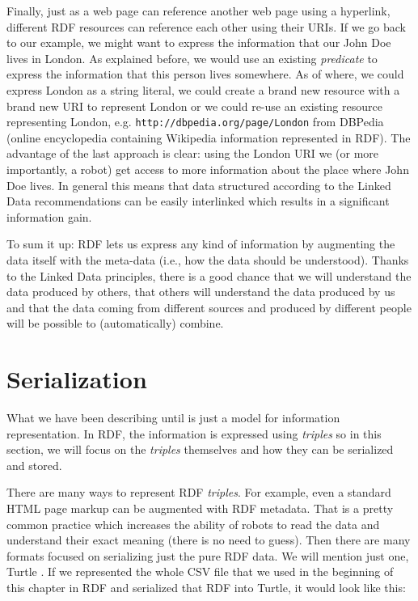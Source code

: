 Finally, just as a web page can reference another web page using a hyperlink, different RDF resources can reference each other using their URIs. If we go back to our example, we might want to express the information that our John Doe lives in London. As explained before, we would use an existing \emph{predicate} to express the information that this person lives somewhere. As of where, we could express London as a string literal, we could create a brand new resource with a brand new URI to represent London or we could re-use an existing resource representing London, e.g. \texttt{http://dbpedia.org/page/London} from DBPedia  \cite{dbpedia} (online encyclopedia containing Wikipedia information represented in RDF). The advantage of the last approach is clear: using the London URI we (or more importantly, a robot) get access to more information about the place where John Doe lives.  In general this means that data structured according to the Linked Data recommendations can be easily interlinked which results in a significant information gain.

To sum it up: RDF lets us express any kind of information by augmenting the data itself with the meta-data (i.e., how the data should be understood). Thanks to the Linked Data principles, there is a good chance that we will understand the data produced by others, that others will understand the data produced by us and that the data coming from different sources and produced by different people will be possible to (automatically) combine.

\section{Serialization}

What we have been describing until is just a model for information representation. In RDF, the information is expressed using \emph{triples} so in this section, we will focus on the \emph{triples} themselves and how they can be serialized and stored.

There are many ways to represent RDF \emph{triples}. For example, even a standard HTML page markup can be augmented with RDF metadata. That is a pretty common practice which increases the ability of robots to read the data and understand their exact meaning (there is no need to guess). Then there are many formats focused on serializing just the pure RDF data. We will mention just one, Turtle \cite{turtle}. If we represented the whole CSV file that we used in the beginning of this chapter in RDF and serialized that RDF into Turtle, it would look like this:

